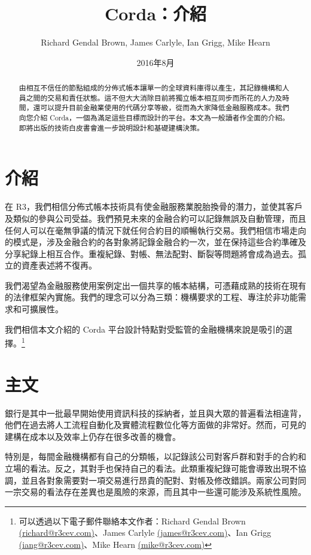 \documentclass[UTF8]{ctexart}
\author{Richard Gendal Brown, James Carlyle, Ian Grigg, Mike Hearn}
\date{2016年8月}
\title{Corda：介紹}
\begin{document}
\maketitle 
\begin{abstract}
由相互不信任的節點組成的分佈式帳本讓單一的全球資料庫得以產生，其記錄機構和人員之間的交易和責任狀態。這不但大大消除目前將獨立帳本相互同步而所花的人力及時間，還可以提升目前金融業使用的代碼分享等級，從而為大家降低金融服務成本。我們向您介紹 Corda，一個為滿足這些目標而設計的平台。本文為一般讀者作全面的介紹。即將出版的技術白皮書會進一步說明設計和基礎建構決策。
\end{abstract}
\newpage
\tableofcontents
\newpage
\section{介紹}
在 R3，我們相信分佈式帳本技術具有使金融服務業脫胎換骨的潛力，並使其客戶及類似的參與公司受益。我們預見未來的金融合約可以記錄無誤及自動管理，而且任何人可以在毫無爭議的情況下就任何合約目的順暢執行交易。我們相信市場走向的模式是，涉及金融合約的各對象將記錄金融合約一次，並在保持這些合約準確及分享紀錄上相互合作。重複紀錄、對帳、無法配對、斷裂等問題將會成為過去。孤立的資產表述將不復再。

我們渴望為金融服務使用案例定出一個共享的帳本結構，可憑藉成熟的技術在現有的法律框架內實施。我們的理念可以分為三類：機構要求的工程、專注於非功能需求和可擴展性。

我們相信本文介紹的 Corda 平台設計特點對受監管的金融機構來說是吸引的選擇。\footnote{可以透過以下電子郵件聯絡本文作者：Richard Gendal Brown \href{mailto:richard@r3cev.com}{(richard@r3cev.com)}、James Carlyle \href{mailto:james@r3cev.com}{(james@r3cev.com)}、Ian Grigg \href{mailto:iang@r3cev.com}{(iang@r3cev.com)}、Mike Hearn \href{mailto:mike@r3cev.com}{(mike@r3cev.com)}}

\section{主文}
銀行是其中一批最早開始使用資訊科技的採納者，並且與大眾的普遍看法相違背，他們在過去將人工流程自動化及實體流程數位化等方面做的非常好。然而，可見的建構在成本以及效率上仍存在很多改善的機會。 

特別是，每間金融機構都有自己的分類帳，以記錄該公司對客戶群和對手的合約和立場的看法。反之，其對手也保持自己的看法。此類重複紀錄可能會導致出現不協調，並且各對象需要對一項交易進行昂貴的配對、對帳及修改錯誤。兩家公司對同一宗交易的看法存在差異也是風險的來源，而且其中一些還可能涉及系統性風險。
\end{document}
